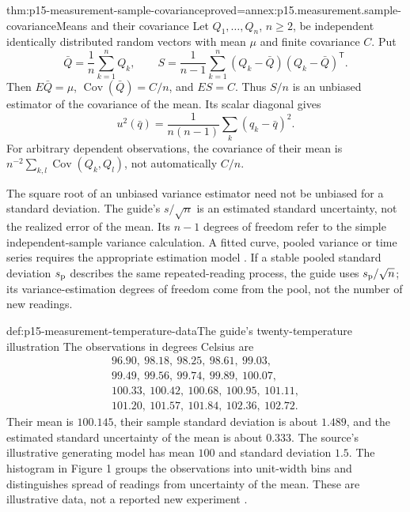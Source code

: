 \begin{hbtheorem}{thm:p15-measurement-sample-covariance}{proved=annex:p15.measurement.sample-covariance}{Means and their covariance}
Let \(Q_1,\ldots,Q_n\), \(n\geq2\), be independent identically distributed
random vectors with mean \(\mu\) and finite covariance \(C\). Put
\[
 \bar Q=\frac1n\sum_{k=1}^n Q_k,\qquad
 S=\frac1{n-1}\sum_{k=1}^n(Q_k-\bar Q)(Q_k-\bar Q)^{\mathsf T}.
\]
Then \(E\bar Q=\mu\), \(\operatorname{Cov}(\bar Q)=C/n\), and \(ES=C\).
Thus \(S/n\) is an unbiased estimator of the covariance of the mean.
Its scalar diagonal gives
\[
 u^2(\bar q)=\frac1{n(n-1)}\sum_k(q_k-\bar q)^2.
\]
For arbitrary dependent observations, the covariance of their mean is
\(n^{-2}\sum_{k,l}\operatorname{Cov}(Q_k,Q_l)\), not automatically \(C/n\).
\end{hbtheorem}

The square root of an unbiased variance estimator need not be unbiased for a
standard deviation. The guide's \(s/\sqrt n\) is an estimated standard
uncertainty, not the realized error of the mean. Its \(n-1\) degrees of freedom
refer to the simple independent-sample variance calculation. A fitted curve,
pooled variance or time series requires the appropriate estimation model
\cite[4.2]{JCGM1002008EMeasurement}. If a stable pooled standard deviation
\(s_{\rm p}\) describes the same repeated-reading process, the guide uses
\(s_{\rm p}/\sqrt n\); its variance-estimation degrees of freedom come from the
pool, not the number of new readings.

\begin{hbexample}{def:p15-measurement-temperature-data}{The guide's twenty-temperature illustration}
The observations in degrees Celsius are
\[
\begin{gathered}
96.90,\ 98.18,\ 98.25,\ 98.61,\ 99.03,\\
99.49,\ 99.56,\ 99.74,\ 99.89,\ 100.07,\\
100.33,\ 100.42,\ 100.68,\ 100.95,\ 101.11,\\
101.20,\ 101.57,\ 101.84,\ 102.36,\ 102.72 .
\end{gathered}
\]
Their mean is \(100.145\), their sample standard deviation is about \(1.489\),
and the estimated standard uncertainty of the mean is about \(0.333\).
The source's illustrative generating model has mean \(100\) and standard
deviation \(1.5\). The histogram in Figure 1 groups the observations into
unit-width bins and distinguishes spread of readings from uncertainty of the
mean. These are illustrative data, not a reported new experiment
\cite[4.4.1--4.4.3, Table~1 and Fig.~1]{JCGM1002008EMeasurement}.
\end{hbexample}

